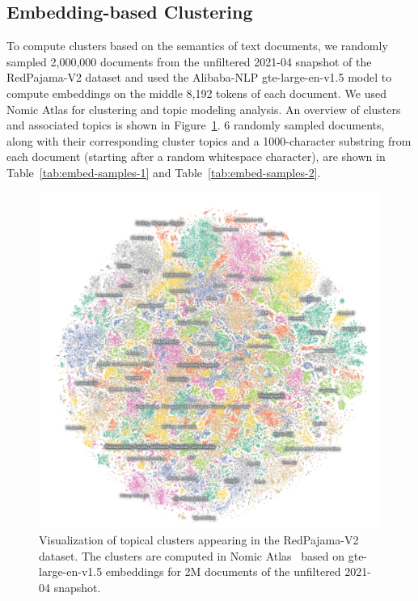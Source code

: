 \documentclass{article}
\begin{document}
\subsection{Embedding-based Clustering}
To compute clusters based on the semantics of text documents, we randomly sampled 2,000,000 documents from the unfiltered 2021-04 snapshot of the RedPajama-V2 dataset and used the Alibaba-NLP gte-large-en-v1.5 model \cite{li2023towards} to compute embeddings on the middle 8,192 tokens of each document. We used Nomic Atlas \cite{Nomic2024} for clustering and topic modeling analysis. An overview of clusters and associated topics is shown in Figure~\ref{fig:embed-clusters}. 6 randomly sampled documents, along with their corresponding cluster topics and a 1000-character substring from each document (starting after a random whitespace character), are shown in Table~\ref{tab:embed-samples-1} and Table~\ref{tab:embed-samples-2}.

\begin{figure}
    \centering
    \includegraphics[width=\textwidth]{figures/nomic-innovative-pareto.jpg}
    \caption{Visualization of topical clusters appearing in the RedPajama-V2 dataset. The clusters are computed in Nomic Atlas~\cite{Nomic2024} based on gte-large-en-v1.5 embeddings for 2M documents of the unfiltered 2021-04 snapshot.}
    \label{fig:embed-clusters}
\end{figure}
\end{document}
